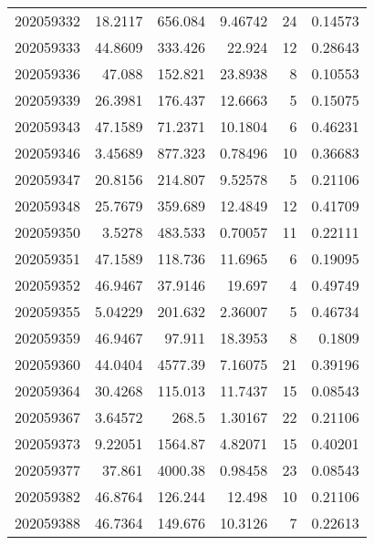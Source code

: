 \begin{tabular}{rrrrrr}
 202059332 &         18.2117  &      656.084  &            9.46742 &          24 & 0.14573 \\
 202059333 &         44.8609  &      333.426  &           22.924   &          12 & 0.28643 \\
 202059336 &         47.088   &      152.821  &           23.8938  &           8 & 0.10553 \\
 202059339 &         26.3981  &      176.437  &           12.6663  &           5 & 0.15075 \\
 202059343 &         47.1589  &       71.2371 &           10.1804  &           6 & 0.46231 \\
 202059346 &          3.45689 &      877.323  &            0.78496 &          10 & 0.36683 \\
 202059347 &         20.8156  &      214.807  &            9.52578 &           5 & 0.21106 \\
 202059348 &         25.7679  &      359.689  &           12.4849  &          12 & 0.41709 \\
 202059350 &          3.5278  &      483.533  &            0.70057 &          11 & 0.22111 \\
 202059351 &         47.1589  &      118.736  &           11.6965  &           6 & 0.19095 \\
 202059352 &         46.9467  &       37.9146 &           19.697   &           4 & 0.49749 \\
 202059355 &          5.04229 &      201.632  &            2.36007 &           5 & 0.46734 \\
 202059359 &         46.9467  &       97.911  &           18.3953  &           8 & 0.1809  \\
 202059360 &         44.0404  &     4577.39   &            7.16075 &          21 & 0.39196 \\
 202059364 &         30.4268  &      115.013  &           11.7437  &          15 & 0.08543 \\
 202059367 &          3.64572 &      268.5    &            1.30167 &          22 & 0.21106 \\
 202059373 &          9.22051 &     1564.87   &            4.82071 &          15 & 0.40201 \\
 202059377 &         37.861   &     4000.38   &            0.98458 &          23 & 0.08543 \\
 202059382 &         46.8764  &      126.244  &           12.498   &          10 & 0.21106 \\
 202059388 &         46.7364  &      149.676  &           10.3126  &           7 & 0.22613 \\

\end{tabular}
